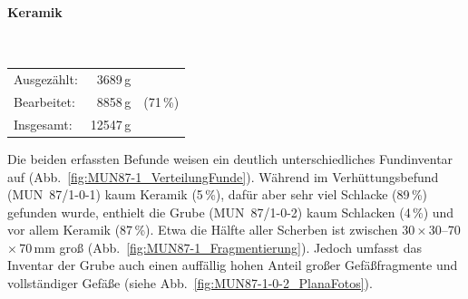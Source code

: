 \paragraph{Keramik\vspace{.5em}}\mbox{}\\
\begin{tabular}{@{}lrl@{}}
Ausgezählt: & 3689\,g & \\ 
Bearbeitet: & 8858\,g & (71\,\%) \\ 
Insgesamt: & 12547\,g & \\ 
\end{tabular} 

\vspace{1em}
\noindent Die beiden erfassten Befunde weisen ein deutlich unterschiedliches Fundinventar auf (Abb.~\ref{fig:MUN87-1_VerteilungFunde}). Während im Verhüttungsbefund (MUN~87/1-0-1) kaum Keramik (5\,\%), dafür aber sehr viel Schlacke (89\,\%) gefunden wurde, enthielt die Grube (MUN~87/1-0-2) kaum Schlacken (4\,\%) und vor allem Keramik (87\,\%). Etwa die Hälfte aller Scherben ist zwischen 30\,$\times$\,30--70\,$\times$\,70\,mm groß (Abb.~\ref{fig:MUN87-1_Fragmentierung}). Jedoch umfasst das Inventar der Grube auch einen auffällig hohen Anteil großer Gefäßfragmente und vollständiger Gefäße (siehe Abb.~\ref{fig:MUN87-1-0-2_PlanaFotos}). 

